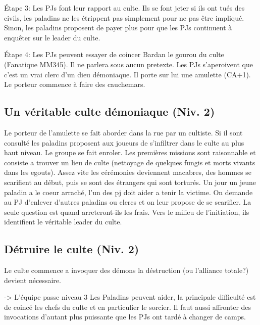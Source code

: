 Étape 3: Les PJs font leur rapport au culte. Ils se font jeter si ils ont tués des civils, les paladins ne 
les étrippent pas simplement pour ne pas être impliqué. Sinon, les paladins proposent de payer plus pour 
que les PJs continuent à enquêter sur le leader du culte.

Étape 4: Les PJs peuvent essayer de coincer Bardan le gourou du culte (Fanatique MM345). Il ne parlera
sous aucun pretexte. Les PJs s'aperoivent que c'est un vrai clerc d'un dieu démoniaque. Il porte sur lui 
une amulette (CA+1). Le porteur commence à faire des cauchemars.

\subsection{Un véritable culte démoniaque (Niv. 2)}

Le porteur de l'amulette se fait aborder dans la rue par un cultiste. Si il sont consulté les paladins
proposent aux joueurs de s'infiltrer dans le culte au plus haut niveau. Le groupe se fait enroler. 
Les premières missions sont raisonnable et consiste a trouver un lieu de culte (nettoyage de quelques
fungis et morts vivants dans les egouts). Assez vite les cérémonies deviennent macabres, des hommes se 
scarifient au début, puis se sont des étrangers qui sont torturés. Un jour un jeune paladin a le coeur 
arraché, l'un des pj doit aider a tenir la victime. On demande au PJ d'enlever d'autres paladins ou
clercs et on leur propose de se scarifier. La seule question est quand arreteront-ils les frais. Vers le 
milieu de l'initiation, ils identifient le véritable leader du culte.

\subsection{Détruire le culte (Niv. 2)}

Le culte commence a invoquer des démons la déstruction (ou l'alliance totale?) devient nécessaire.

 -> L'équipe passe niveau 3
Les Paladins peuvent aider, la principale difficulté est de coincé les chefs du culte et en particulier
le sorcier. Il faut aussi affronter des invocations d'autant plus puissante que les PJs ont tardé à changer
de camps. 




